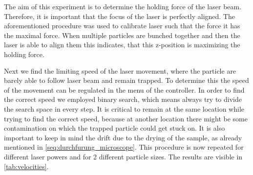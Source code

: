 \documentclass[12pt,english,ngerman]{scrartcl}
\begin{document}
The aim of this experiment is to determine the holding force of the laser beam.
Therefore, it is important that the focus of the laser is perfectly aligned.
The aforementioned procedure was used to calibrate laser such that the force it
has the maximal force. When multiple particles are bunched together and then
the laser is able to align them this indicates, that this z-position is
maximizing the holding force.

Next we find the limiting speed of the laser movement, where the particle are
barely able to follow laser beam and remain trapped. To determine this the
speed of the movement can be regulated in the menu of the controller. In order
to find the correct speed we employed binary search, which means always try to
divide the search space in every step. It is critical to remain at the same
location while trying to find the correct speed, because at another location
there might be some contamination on which the trapped particle could get stuck
on. It is also important to keep in mind the drift due to the drying of the
sample, as already mentioned in \autoref{seq:durchfurung_microscope}. This
procedure is now repeated for different laser powers and for 2 different
particle sizes. The results are visible in \autoref{tab:velocities}.
\end{document}
